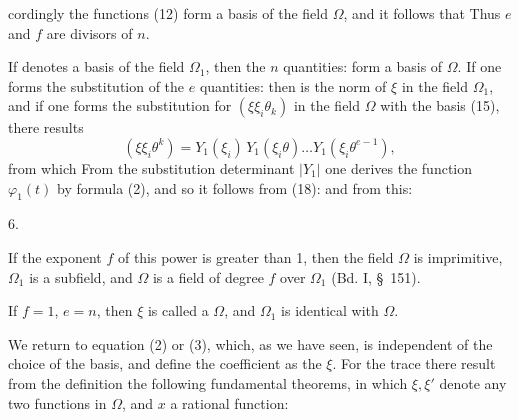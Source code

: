 cordingly the functions (12) form a basis of the field $\Omega$, and it follows that
Thus $e$ and $f$ are divisors of $n$.

If
denotes a basis of the field $\Omega_1$, then the $n$ quantities:
form a basis of $\Omega$. If one forms the substitution of the $e$ quantities:
then
is the norm of $\xi$ in the field $\Omega_1$, and if one forms the substitution for $(\xi \xi_i \theta_k)$ in the field $\Omega$ with the basis (15), there results
\[
(\xi \xi_i \theta^k) = Y_1(\xi_i)\, Y_1(\xi_i \theta) \dots Y_1(\xi_i \theta^{e-1}),
\]
from which
From the substitution determinant $|Y_1|$ one derives the function $\varphi_1(t)$ by formula (2), and so it follows from (18):
and from this:

6. 

If the exponent $f$ of this power is greater than 1, then the field $\Omega$ is imprimitive, $\Omega_1$ is a subfield, and $\Omega$ is a field of degree $f$ over $\Omega_1$ (Bd. I, \S\ 151).

If $f = 1$, $e = n$, then $\xi$ is called a  $\Omega$, and $\Omega_1$ is identical with $\Omega$.

We return to equation (2) or (3), which, as we have seen, is independent of the choice of the basis, and define the coefficient
as the  $\xi$. For the trace there result from the definition the following fundamental theorems, in which $\xi, \xi'$ denote any two functions in $\Omega$, and $x$ a rational function:
